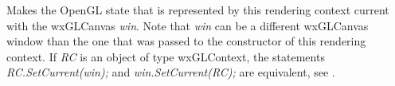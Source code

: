 

\label{wxglcontextsetcurrent}


Makes the OpenGL state that is represented by this rendering context current with the wxGLCanvas {\it win}.
Note that {\it win} can be a different wxGLCanvas window than the one that was passed to the constructor of this rendering context.
If { \it RC } is an object of type wxGLContext, the statements {\it RC.SetCurrent(win);} and {\it win.SetCurrent(RC);} are equivalent,
see .

